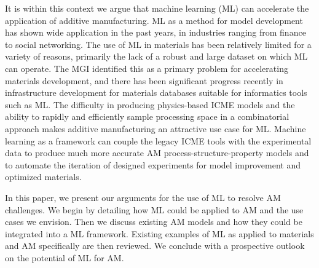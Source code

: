 It is within this context we argue that machine learning (ML) can accelerate the application of additive manufacturing. ML as a method for model development has shown wide application in the past years, in industries ranging from finance to social networking. The use of ML in materials has been relatively limited for a variety of reasons, primarily the lack of a robust and large dataset on which ML can operate. The MGI identified this as a primary problem for accelerating materials development, and there has been significant progress recently in infrastructure development for materials databases suitable for informatics tools such as ML. The difficulty in producing physics-based ICME models and the ability to rapidly and efficiently sample processing space in a combinatorial approach makes additive manufacturing an attractive use case for ML. Machine learning as a framework can couple the legacy ICME tools with the experimental data to produce much more accurate AM process-structure-property models and to automate the iteration of designed experiments for model improvement and optimized materials.

In this paper, we present our arguments for the use of ML to resolve AM challenges. We begin by detailing how ML could be applied to AM and the use cases we envision. Then we discuss existing AM models and how they could be integrated into a ML framework. Existing examples of ML as applied to materials and AM specifically are then reviewed. We conclude with a prospective outlook on the potential of ML for AM.

